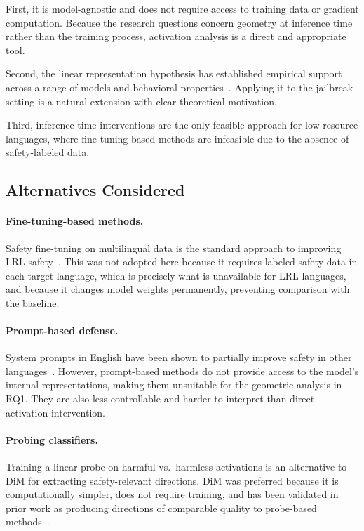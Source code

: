 First, it is model-agnostic and does not require access to training data or gradient computation. Because the research questions concern geometry at inference time rather than the training process, activation analysis is a direct and appropriate tool.

Second, the linear representation hypothesis has established empirical support across a range of models and behavioral properties~\citep{zou2023representation, arditi2024refusal}. Applying it to the jailbreak setting is a natural extension with clear theoretical motivation.

Third, inference-time interventions are the only feasible approach for low-resource languages, where fine-tuning-based methods are infeasible due to the absence of safety-labeled data.

\subsection{Alternatives Considered}

\paragraph{Fine-tuning-based methods.}
Safety fine-tuning on multilingual data is the standard approach to improving LRL safety~\citep{wang2024all}. This was not adopted here because it requires labeled safety data in each target language, which is precisely what is unavailable for LRL languages, and because it changes model weights permanently, preventing comparison with the baseline.

\paragraph{Prompt-based defense.}
System prompts in English have been shown to partially improve safety in other languages~\citep{wei2023jailbroken}. However, prompt-based methods do not provide access to the model's internal representations, making them unsuitable for the geometric analysis in RQ1. They are also less controllable and harder to interpret than direct activation intervention.

\paragraph{Probing classifiers.}
Training a linear probe on harmful vs.\ harmless activations is an alternative to DiM for extracting safety-relevant directions. DiM was preferred because it is computationally simpler, does not require training, and has been validated in prior work as producing directions of comparable quality to probe-based methods~\citep{arditi2024refusal}.

